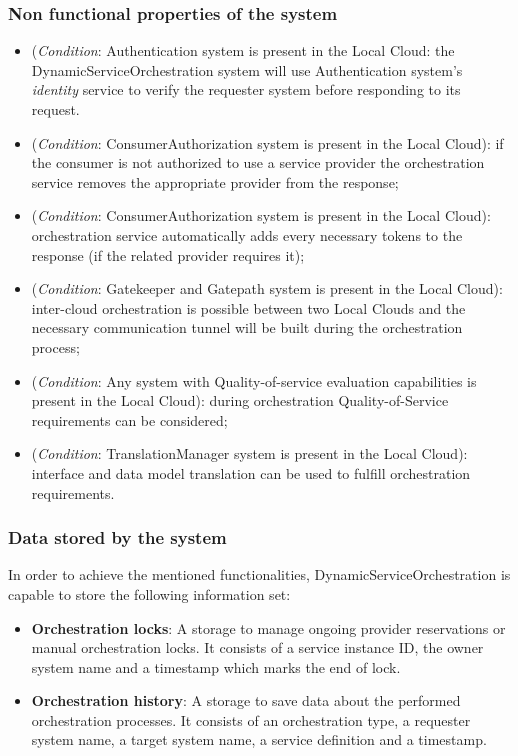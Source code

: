 \documentclass[a4paper]{arrowhead}
\begin{document}
\subsubsection {Non functional properties of the system}

\begin{itemize}
    \item (\textit{Condition}: Authentication system is present in the Local Cloud: the DynamicServiceOrchestration system will use Authentication system's \textit{identity} service to verify the requester system before responding to its request.
    \item (\textit{Condition}: ConsumerAuthorization system is present in the Local Cloud): if the consumer is not authorized to use a service provider the orchestration service removes the appropriate provider from the response;
    \item (\textit{Condition}: ConsumerAuthorization system is present in the Local Cloud): orchestration service automatically adds every necessary tokens to the response (if the related provider requires it);
    \item (\textit{Condition}: Gatekeeper and Gatepath system is present in the Local Cloud): inter-cloud orchestration is possible between two Local Clouds and the necessary communication tunnel will be built during the orchestration process;
    \item (\textit{Condition}: Any system with Quality-of-service evaluation capabilities is present in the Local Cloud): during orchestration Quality-of-Service requirements can be considered;
    \item (\textit{Condition}: TranslationManager system is present in the Local Cloud): interface and data model translation can be used to fulfill orchestration requirements.
\end{itemize}

\subsubsection {Data stored by the system}
In order to achieve the mentioned functionalities, DynamicServiceOrchestration is capable to store the following information set:

\begin{itemize}
    \item \textbf{Orchestration locks}: A storage to manage ongoing provider reservations or manual orchestration locks. It consists of a service instance ID, the owner system name and a timestamp which marks the end of lock.
    \item \textbf{Orchestration history}: A storage to save data about the performed orchestration processes. It consists of an orchestration type, a requester system name, a target system name, a service definition and a timestamp.
\end{itemize}
\end{document}
